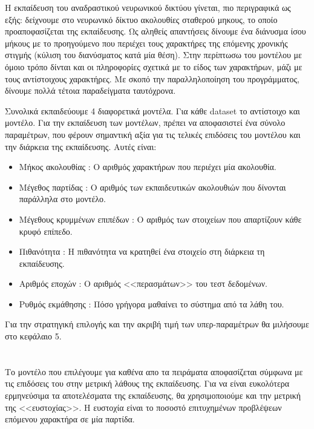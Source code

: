 Η εκπαίδευση του αναδραστικού νευρωνικού δικτύου γίνεται, πιο περιγραφικά ως εξής: δείχνουμε στο νευρωνικό δίκτυο ακολουθίες σταθερού μηκους, το οποίο προαποφασίζεται της εκπαίδευσης.
Ως αληθείς απαντήσεις δίνουμε ένα διάνυσμα ίσου μήκους με το προηγούμενο που περιέχει τους χαρακτήρες της επόμενης χρονικής στιγμής (κύλιση του διανύσματος κατά μία θέση).
Στην περίπτωσω του μοντέλου   με όμοιο τρόπο δίνται και οι πληροφορίες σχετικά με το είδος των χαρακτήρων, μάζι με τους αντίστοιχους χαρακτήρες.
Με σκοπό την παραλληλοποίηση του προγράμματος, δίνουμε πολλά τέτοια παραδείγματα ταυτόχρονα.

Συνολικά εκπαιδεύουμε 4 διαφορετικά μοντέλα. Για κάθε dataset το αντίστοιχο  και  μοντέλο.
Για την εκπαίδευση των μοντέλων, πρέπει να αποφασιστεί ένα σύνολο παραμέτρων, που φέρουν σημαντική αξία για τις τελικές επιδόσεις του μοντέλου και την διάρκεια της εκπαίδευσης. Αυτές είναι:

\begin{itemize} 
\item Μήκος ακολουθίας : Ο αριθμός χαρακτήρων που περιέχει μία ακολουθία.
\item Μέγεθος παρτίδας : Ο αριθμός των εκπαιδευτικών ακολουθιών που δίνονται παράλληλα στο μοντέλο.
\item Μέγεθους κρυμμένων επιπέδων : Ο αριθμός των στοιχείων  που απαρτίζουν κάθε κρυφό επίπεδο.
\item Πιθανότητα : Η πιθανότητα να κρατηθεί ένα στοιχείο στη διάρκεια τη εκπαίδευσης.
\item Αριθμός εποχών : Ο αριθμός <<περασμάτων>> του τεστ δεδομένων.
\item Ρυθμός εκμάθησης : Πόσο γρήγορα μαθαίνει το σύστημα από τα λάθη του.

\end{itemize}

Για την στρατηγική επιλογής και την ακριβή τιμή των υπερ-παραμέτρων θα μιλήσουμε στο κεφάλαιο 5.

\section{}

Το μοντέλο που επιλέγουμε για καθένα απο τα πειράματα αποφασίζεται σύμφωνα με τις επιδόσεις του στην μετρική λάθους της εκπαίδευσης.
Για να είναι ευκολότερα ερμηνεύσιμα τα αποτελέσματα της εκπαίδευσης, θα χρησιμοποιούμε και την μετρική της <<ευστοχίας>>.
Η ευστοχία είναι το ποσοστό επιτυχημένων προβλέψεων επόμενου χαρακτήρα σε μία παρτίδα.

